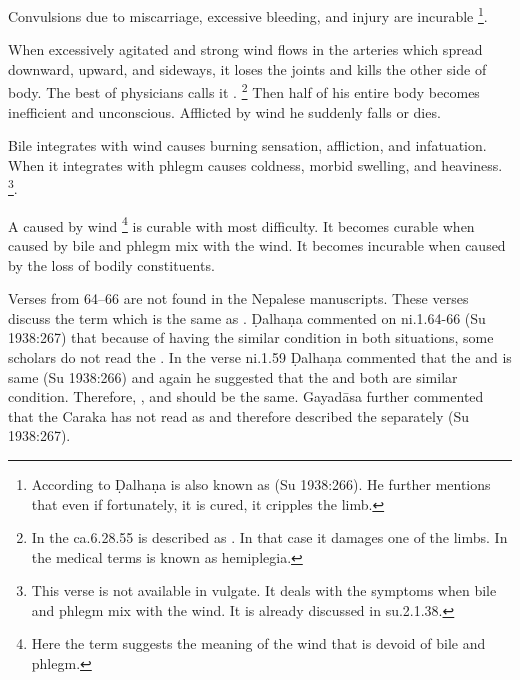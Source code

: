 \begin{translation}
\item[59] Convulsions due to miscarriage, excessive bleeding, and injury are 
incurable \footnote{According to Ḍalhaṇa  is also known as 
 (Su 1938:266). He further mentions that even if fortunately, it is 
cured, it cripples the limb.}.

\item[60--62] When excessively agitated and strong wind flows in the arteries which spread downward, upward, and sideways, it loses the joints and kills the other side of body. The best of physicians calls it . \footnote{In the ca.6.28.55  is described as . In that case it damages one of the limbs.  In the medical terms  is known as hemiplegia.} Then half of his entire body becomes inefficient and unconscious. Afflicted by wind he suddenly falls or dies.

\item[62.1] Bile integrates with wind causes burning sensation, affliction, and infatuation. When it integrates with phlegm causes coldness, morbid swelling, and heaviness. \footnote{This verse is not available in vulgate. It deals with the symptoms when bile and phlegm mix with the wind. It is already discussed in su.2.1.38.}. 

\item[63] A  caused by wind \footnote{Here the term  suggests the meaning of the wind that is devoid of bile and phlegm.} is curable with most difficulty. It becomes curable when caused by bile and phlegm mix with the wind. It becomes incurable when caused by the loss of bodily constituents.

\item[64--66] Verses from 64--66 are not found in the Nepalese manuscripts. These verses discuss the term  which is the same as . Ḍalhaṇa commented on ni.1.64-66 (Su 1938:267) that because of having the similar condition in both situations, some scholars do not read the . In the verse ni.1.59 Ḍalhaṇa commented that the  and  is same (Su 1938:266) and again he suggested that the  and  both are similar condition. Therefore, ,  and  should be the same. Gayadāsa further commented that the Caraka has not read  as  and therefore described the  separately (Su 1938:267).


\end{translation}
